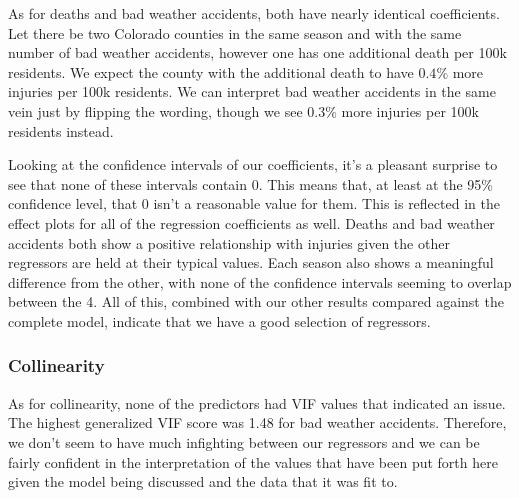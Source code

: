 As for deaths and bad weather accidents, both have nearly identical coefficients. Let there be two Colorado counties in the same season and with the same number of bad weather accidents, however one has one additional death per 100k residents. We expect the county with the additional death to have $0.4\%$ more injuries per 100k residents. We can interpret bad weather accidents in the same vein just by flipping the wording, though we see $0.3\%$ more injuries per 100k residents instead.

Looking at the confidence intervals of our coefficients, it's a pleasant surprise to see that none of these intervals contain 0. This means that, at least at the 95\% confidence level, that 0 isn't a reasonable value for them. This is reflected in the effect plots for all of the regression coefficients as well. Deaths and bad weather accidents both show a positive relationship with injuries given the other regressors are held at their typical values. Each season also shows a meaningful difference from the other, with none of the confidence intervals seeming to overlap between the 4. All of this, combined with our other results compared against the complete model, indicate that we have a good selection of regressors. 

\subsubsection*{Collinearity}

As for collinearity, none of the predictors had VIF values that indicated an issue. The highest generalized VIF score was 1.48 for bad weather accidents. Therefore, we don't seem to have much infighting between our regressors and we can be fairly confident in the interpretation of the values that have been put forth here given the model being discussed and the data that it was fit to.
